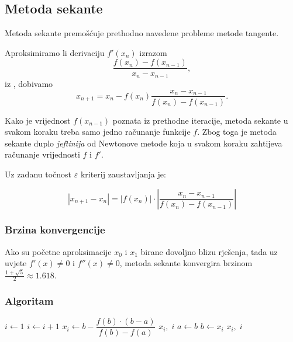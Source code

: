 \subsection{Metoda sekante}

Metoda sekante premošćuje prethodno navedene probleme metode tangente.

Aproksimiramo li derivaciju $f'(x_n)$ izrazom
$$
\dfrac{f(x_n)-f(x_{n-1})}{x_n - x_{n-1}},
$$
iz , dobivamo
$$
x_{n+1} = x_n - f(x_n)\dfrac{x_n-x_{n-1}}{f(x_n)-f(x_{n-1})}.
$$

Kako je vrijednost $f(x_{n-1})$ poznata iz prethodne iteracije, metoda sekante u
svakom koraku treba samo jedno računanje funkcije $f$. Zbog toga je metoda
sekante duplo \textit{jeftinija} od Newtonove metode koja u svakom koraku
zahtijeva računanje vrijednosti $f$ i $f'$.

Uz zadanu točnost $\varepsilon$ kriterij zaustavljanja je:

$$
|x_{n+1}-x_n| = |f(x_n)|\cdot\left|\frac{x_n-x_{n-1}}{f(x_n)-f(x_{n-1})}\right|
$$

\subsubsection{Brzina konvergencije}

Ako su početne aproksimacije $x_0$ i $x_1$ birane dovoljno blizu rješenja, tada
uz uvjete $f'(x)\neq 0$ i $f''(x)\neq 0$, metoda sekante konvergira brzinom
$\frac{1+\sqrt{5}}{2}\approx 1.618$.

\subsubsection{Algoritam}

\begin{algorithmic}
    \State $i \gets 1$
        \State $i \gets i + 1$
        \State $x_i \gets b - \dfrac{f(b) \cdot (b - a)}{f(b) - f(a)}$
            \State \Return $x_i,\;i$ 
        \Else
            \State $a \gets b$
            \State $b \gets x_i$
        \EndIf
        \EndIf
    \EndWhile
    \State \Return $x_i,\;i$
\EndFunction
\end{algorithmic}
